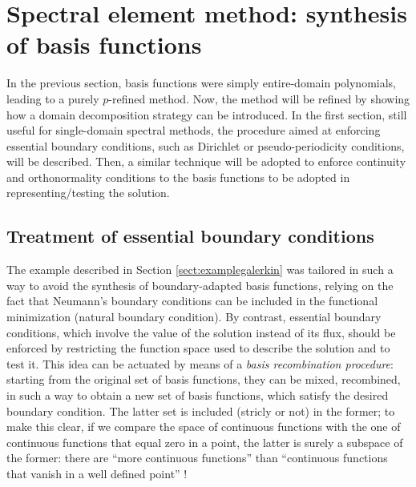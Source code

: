\documentclass[a4paper,12pt]{article}
\begin{document}




\section{Spectral element method: synthesis of basis functions}

In the previous section, basis functions were simply entire-domain polynomials, leading to a purely $p$-refined method. Now, the method will be refined by showing how a domain decomposition strategy can be introduced. In the first section, still useful for single-domain spectral methods, the procedure aimed at enforcing essential boundary conditions, such as Dirichlet or pseudo-periodicity conditions, will be described. Then, a similar technique will be adopted to enforce continuity and orthonormality conditions to the basis functions to be adopted in representing/testing the solution.

\subsection{Treatment of essential boundary conditions}

The example described in Section \ref{sect:examplegalerkin} was tailored in such a way to avoid the synthesis of boundary-adapted basis functions, relying on the fact that Neumann's boundary conditions can be included in the functional minimization (natural boundary condition). By contrast, essential boundary conditions, which involve the value of the solution instead of its flux, should be enforced by restricting the function space used to describe the solution and to test it. This idea can be actuated by means of a \textit{basis recombination procedure}: starting from the original set of basis functions, they can be mixed, recombined, in such a way to obtain a new set of basis functions, which satisfy the desired boundary condition. The latter set is included (stricly or not) in the former; to make this clear, if we compare the space of continuous functions with the one of continuous functions that equal zero in a point, the latter is surely a subspace of the former: there are ``more continuous functions'' than ``continuous functions that vanish in a well defined point'' !
\end{document}

